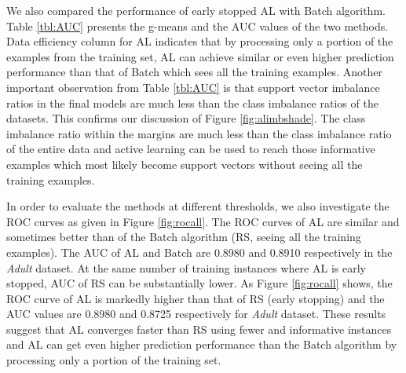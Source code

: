 We also compared the performance of early stopped AL with Batch algorithm. Table \ref{tbl:AUC} presents the g-means and the AUC values of the two methods. Data efficiency column for AL indicates that by processing only a portion of the examples from the training set, AL can achieve similar or even higher prediction performance than that of Batch which sees all the training examples. Another important observation from Table \ref{tbl:AUC} is that support vector imbalance ratios in the final models are much less than the class imbalance ratios of the datasets. This confirms our discussion of Figure \ref{fig:alimbshade}. The class imbalance ratio within the margins are much less than the class imbalance ratio of the entire data and active learning can be used to reach those informative examples which most likely become support vectors without seeing all the training examples.

In order to evaluate the methods at different thresholds, we also investigate the ROC curves as given in Figure \ref{fig:rocall}. The ROC curves of AL are similar and sometimes better than of the Batch algorithm (RS, seeing all the training examples). The AUC of AL and Batch are 0.8980 and 0.8910 respectively in the \emph{Adult} dataset. At the same number of training instances where AL is early stopped, AUC of RS can be substantially lower. As Figure \ref{fig:rocall} shows, the ROC curve of AL is markedly higher than that of RS (early stopping) and the AUC values are 0.8980 and 0.8725 respectively for \emph{Adult} dataset. These results suggest that AL converges faster than RS using fewer and informative instances and AL can get even higher prediction performance than the Batch algorithm by processing only a portion of the training set.

